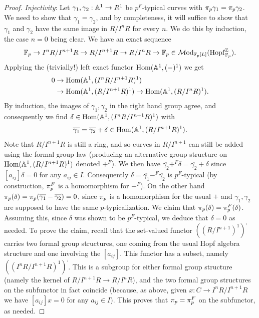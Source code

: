 \begin{proof}
\emph{Injectivity}:
Let $\gamma_1, \gamma_2: \mathbb A^1 \to R^1$ be $p^F$-typical curves with $\mathrm \pi_p \gamma_1 = \mathrm \pi_p \gamma_2$.
We need to show that $\gamma_1 = \gamma_2$, and by completeness, it will suffice to show that $\gamma_1$ and $\gamma_2$ have the same image in $R/I^n R$ for every $n$.
We do this by induction, the case $n=0$ being clear.
We have an exact sequence \[ \mathbb{F}_p \to I^nR/I^{n+1}R \to R/I^{n+1}R \to R/I^nR \to \mathbb{F}_p \in \mathcal{M}\mathrm{od}_{\mathbb{F}_p[L]}(\mathrm{Hopf}_{\mathbb{F}_p}^{\mathbb{Z}}). \]
Applying the (trivially!) left exact functor $\operatorname{Hom}(\mathbb A^1, (\mathord-)^1)$ we get \[ \begin{aligned} 0 &\to \operatorname{Hom}(\mathbb A^1,(I^nR/I^{n+1}R)^1) \\ &\to \operatorname{Hom}(\mathbb A^1,(R/I^{n+1}R)^1) \to \operatorname{Hom}(\mathbb A^1,(R/I^n R)^1). \end{aligned} \]
By induction, the images of $\gamma_1, \gamma_2$ in the right hand group agree, and consequently we find $\delta \in \operatorname{Hom}(\mathbb A^1, (I^nR/I^{n+1}R)^1)$ with \[ \overline{\gamma_1} = \overline{\gamma_2} + \delta \in \operatorname{Hom}(\mathbb A^1, (R/I^{n+1}R)^1). \]
Note that $R/I^{n+1}R$ is still a ring, and so curves in $R/I^{n+1}$ can still be added using the formal group law (producing an alternative group structure on $\operatorname{Hom}(\mathbb A^1, (R/I^{n+1}R)^1)$ denoted $+^F$).
We then have $\overline{\gamma_2} +^F \delta = \overline{\gamma_2} + \delta$ since $[a_{ij}]\delta = 0$ for any $a_{ij} \in I$.
Consequently $\delta = \overline{\gamma_1} -^F \overline{\gamma_2}$ is $p^F$-typical (by construction, $\mathrm \pi_p^F$ is a homomorphism for $+^F$).
On the other hand $\mathrm \pi_p(\delta) = \mathrm \pi_p(\overline{\gamma_1} - \overline{\gamma_2}) = 0$, since $\mathrm \pi_p$ is a homomorphism for the usual $+$ and $\gamma_1, \gamma_2$ are supposed to have the same $p$-typicalization.
We claim that $\mathrm \pi_p(\delta) = \mathrm \pi_p^F(\delta)$.
Assuming this, since $\delta$ was shown to be $p^F$-typical, we deduce that $\delta=0$ as needed.
To prove the claim, recall that the set-valued functor $((R/I^{n+1})^1)^\comp$ carries two formal group structures, one coming from the usual Hopf algebra structure and one involving the $[a_{ij}]$.
This functor has a subset, namely $((I^nR/I^{n+1}R)^1)^\comp$.
This is a subgroup for either formal group structure (namely the kernel of $R/I^{n+1}R \to R/I^nR$), and the two formal group structures on the subfunctor in fact coincide (because, as above, given $x: C \to I^nR/I^{n+1}R$ we have $[a_{ij}]x = 0$ for any $a_{ij} \in I$).
This proves that $\mathrm \pi_p = \mathrm \pi_p^F$ on the subfunctor, as needed.


\end{proof}
